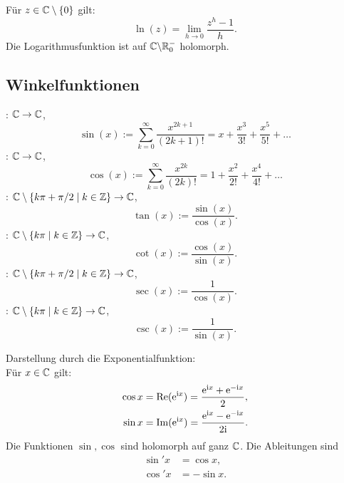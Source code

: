 Für $z\in\mathbb C\setminus\{0\}$ gilt:
\begin{equation}
\ln(z)=\lim_{h\to 0}\frac{z^h-1}{h}.
\end{equation}
Die Logarithmusfunktion ist auf $\mathbb C{\setminus}\mathbb R_0^-$ holomorph.

\subsection{Winkelfunktionen}
\begin{definition}[Winkelfunktionen]
: $\mathbb C\to\mathbb C$,
\begin{equation}
\sin(x) := \sum_{k=0}^\infty \frac{x^{2k+1}}{(2k+1)!}
= x+\frac{x^3}{3!}+\frac{x^5}{5!}+\ldots
\end{equation}
: $\mathbb C\to\mathbb C$,
\begin{equation}
\cos(x) := \sum_{k=0}^\infty \frac{x^{2k}}{(2k)!}
= 1+\frac{x^2}{2!}+\frac{x^4}{4!}+\ldots
\end{equation}
: $\mathbb C\setminus\{k\pi+\pi/2\mid k\in\mathbb Z\}\to\mathbb C$,
\begin{equation}
\tan(x) := \frac{\sin(x)}{\cos(x)}.
\end{equation}
: $\mathbb C\setminus\{k\pi\mid k\in\mathbb Z\}\to\mathbb C$,
\begin{equation}
\cot(x) := \frac{\cos(x)}{\sin(x)}.
\end{equation}
: $\mathbb C\setminus\{k\pi+\pi/2\mid k\in\mathbb Z\}\to\mathbb C$,
\begin{equation}
\sec(x) := \frac{1}{\cos(x)}.
\end{equation}
: $\mathbb C\setminus\{k\pi\mid k\in\mathbb Z\}\to\mathbb C$,
\begin{equation}
\csc(x) := \frac{1}{\sin(x)}.
\end{equation}
\end{definition}
\noindent
Darstellung durch die Exponentialfunktion:\\
Für $x\in\mathbb C$ gilt:
\begin{align}
\cos x &= \operatorname{Re}(\mathrm e^{\mathrm i x}) = \frac{\mathrm e^{\mathrm i x}+\mathrm e^{-\mathrm i x}}{2},\\
\sin x &= \operatorname{Im}(\mathrm e^{\mathrm i x}) = \frac{\mathrm e^{\mathrm i x}-\mathrm e^{-\mathrm i x}}{2\mathrm i}.
\end{align}
Die Funktionen $\sin, \cos$ sind holomorph auf ganz $\mathbb C$.
Die Ableitungen sind
\begin{align}
\sin' x &= \cos x,\\
\cos' x &= -\sin x.
\end{align}

